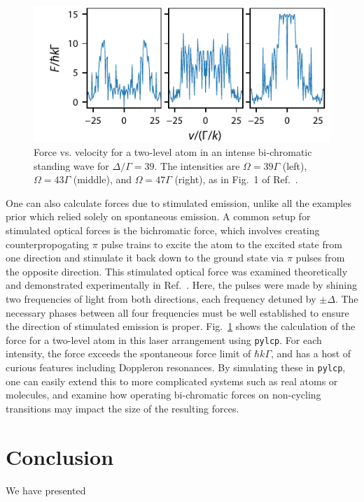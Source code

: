 \documentclass[final,5p,times,twocolumn]{elsarticle}
\begin{document}
\begin{figure}
	\center
	\includegraphics{figs/bichromatic_force}
	\caption{\label{fig:bichromatic} Force vs. velocity for a two-level atom in an intense bi-chromatic standing wave for $\Delta/\Gamma=39$.  The intensities are $\Omega =39\Gamma$ (left), $\Omega =43\Gamma$ (middle), and $\Omega =47\Gamma$ (right), as in Fig.~1 of Ref.~\cite{Soding1997}.}
\end{figure}

One can also calculate forces due to stimulated emission, unlike all the examples prior which relied solely on spontaneous emission.  A common setup for stimulated optical forces is the bichromatic force, which involves creating counterpropogating $\pi$ pulse trains to excite the atom to the excited state from one direction and stimulate it back down to the ground state via $\pi$ pulses from the opposite direction.  This stimulated optical force was examined theoretically and demonstrated experimentally in Ref.~\cite{Soding1997}.   Here, the pulses were made by shining two frequencies of light from both directions, each frequency detuned by $\pm\Delta$.  The necessary phases between all four frequencies must be well established to ensure the direction of stimulated emission is proper.  Fig.~\ref{fig:bichromatic} shows the calculation of the force for a two-level atom in this laser arrangement using {\tt pylcp}.  For each intensity, the force exceeds the spontaneous force limit of $\hbar k \Gamma$, and has a host of curious features including Doppleron resonances.  By simulating these in {\tt pylcp}, one can easily extend this to more complicated systems such as real atoms or molecules, and examine how operating bi-chromatic forces on non-cycling transitions may impact the size of the resulting forces.

\section{Conclusion}
We have presented 
\end{document}
